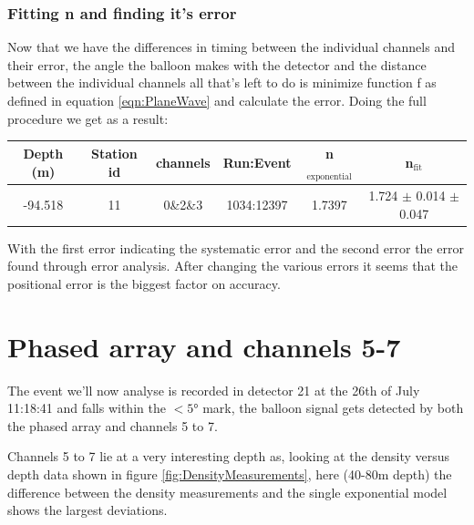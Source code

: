 \subsubsection{Fitting n and finding it's error}
Now that we have the differences in timing between the individual channels and their error, the
angle the balloon makes with the detector and the distance between the individual channels
all that's left to do is minimize function f as defined in equation \ref{eqn:PlaneWave} and
calculate the error. Doing the full procedure we get as a result:
\begin{center}
\begin{tabular}{||c c c c c c||}
 \hline
 Depth (m) & Station id & channels & Run:Event & n$_\text{exponential}$ & n$_\text{fit}$\\ [0.5ex]
 \hline\hline
 -94.518 & 11 & 0\&2\&3 & 1034:12397 & 1.7397 & 1.724 $\pm$ 0.014 $\pm$ 0.047 \\
 \hline
\end{tabular}
\end{center}
With the first error indicating the systematic error and the second error the error found through
error analysis. After changing the various errors it seems that the positional error is the biggest
factor on accuracy.

\section{Phased array and channels 5-7}
The event we'll now analyse is recorded in detector 21 at the 26th of July
11:18:41 and falls within the $<5$° mark, the balloon signal gets detected
by both the phased array and channels 5 to 7.

Channels 5 to 7 lie at a very interesting depth as, looking at 
the density versus depth data shown in figure \ref{fig:DensityMeasurements},
here (40-80m depth) the difference between the density measurements and the single
exponential model shows the largest deviations. 

